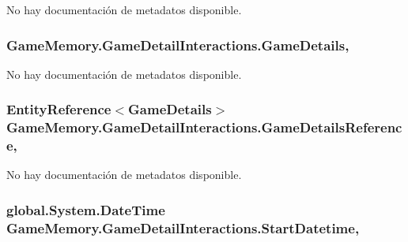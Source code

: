 No hay documentación de metadatos disponible. 

\hypertarget{class_game_memory_1_1_game_detail_interactions_ac8ae8dbae74af6bdd6c172b0d0b0acf5}{
\subsubsection[{Game\-Details}]{ Game\-Memory.\-Game\-Detail\-Interactions.\-Game\-Details\hspace{0.3cm}{\ttfamily [get]}, {\ttfamily [set]}}}\label{class_game_memory_1_1_game_detail_interactions_ac8ae8dbae74af6bdd6c172b0d0b0acf5}


No hay documentación de metadatos disponible. 

\hypertarget{class_game_memory_1_1_game_detail_interactions_a33a1137aaeec41b55d19507225ed303f}{
\subsubsection[{Game\-Details\-Reference}]{\setlength{\rightskip}{0pt plus 5cm}Entity\-Reference$<${\bf Game\-Details}$>$ Game\-Memory.\-Game\-Detail\-Interactions.\-Game\-Details\-Reference\hspace{0.3cm}{\ttfamily [get]}, {\ttfamily [set]}}}\label{class_game_memory_1_1_game_detail_interactions_a33a1137aaeec41b55d19507225ed303f}


No hay documentación de metadatos disponible. 

\hypertarget{class_game_memory_1_1_game_detail_interactions_a45ccc8af7e045eb3b85e25fda5251ef6}{
\subsubsection[{Start\-Datetime}]{\setlength{\rightskip}{0pt plus 5cm}global.\-System.\-Date\-Time Game\-Memory.\-Game\-Detail\-Interactions.\-Start\-Datetime\hspace{0.3cm}{\ttfamily [get]}, {\ttfamily [set]}}}\label{class_game_memory_1_1_game_detail_interactions_a45ccc8af7e045eb3b85e25fda5251ef6}


